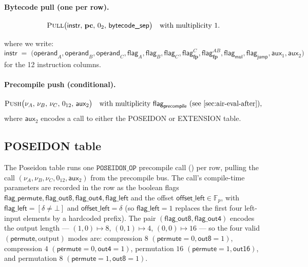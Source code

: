 \documentclass{article}
\theoremstyle{definition}
\newcommand{\Fp}{\mathbb F_p}
\begin{document}
\paragraph{Bytecode pull (one per row).}
\[
\textsc{Pull}\big(\textsf{instr},\, \textbf{pc},\, 0_2,\, \textsf{bytecode\_sep}\big) \quad \text{with multiplicity } 1.
\]

where we write:
\[
\textsf{instr} \;=\; \big(\textsf{operand}_A, \textsf{operand}_B, \textsf{operand}_C, \textsf{flag}_A, \textsf{flag}_B, \textsf{flag}_C, \textsf{flag}^{C}_\textbf{fp}, \textsf{flag}^{AB}_\textbf{fp}, \textsf{flag}_\textsf{mul}, \textsf{flag}_\textsf{jump}, \textsf{aux}_1, \textsf{aux}_2\big)
\]
for the 12 instruction columns.

\paragraph{Precompile push (conditional).}
\[
\textsc{Push}\big(\nu_A,\, \nu_B,\, \nu_C,\, 0_{12},\, \textsf{aux}_2\big) \quad \text{with multiplicity } \textsf{flag}_\textsf{precompile} \text{ (see \Cref{sec:air-eval-after})},
\]
where $\textsf{aux}_2$ encodes a call to either the \textsf{POSEIDON} or \textsf{EXTENSION} table.

\subsection{POSEIDON table}

The Poseidon table runs one $\texttt{POSEIDON\_OP}$ precompile call () per row, pulling the call $(\nu_A, \nu_B, \nu_C, 0_{12}, \textsf{aux}_2)$ from the precompile bus. The call's compile-time parameters are recorded in the row as the boolean flags $\textsf{flag\_permute}, \textsf{flag\_out8}, \textsf{flag\_out4}, \textsf{flag\_left}$ and the offset $\textsf{offset\_left} \in \Fp$, with $\textsf{flag\_left} = [\delta \neq \bot]$ and $\textsf{offset\_left} = \delta$ (so $\textsf{flag\_left} = 1$ replaces the first four left-input elements by a hardcoded prefix). The pair $(\textsf{flag\_out8}, \textsf{flag\_out4})$ encodes the output length — $(1, 0) \mapsto 8$, $(0, 1) \mapsto 4$, $(0, 0) \mapsto 16$ — so the four valid $(\textsf{permute}, \text{output})$ modes are: compression $8$ $(\textsf{permute}{=}0, \textsf{out8}{=}1)$, compression $4$ $(\textsf{permute}{=}0, \textsf{out4}{=}1)$, permutation $16$ $(\textsf{permute}{=}1, \textsf{out16})$, and permutation $8$ $(\textsf{permute}{=}1, \textsf{out8}{=}1)$.
\end{document}
